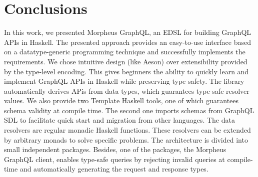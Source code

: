\chapter{Conclusions}

In this work, we presented Morpheus GraphQL, an EDSL for building GraphQL APIs in Haskell. The presented approach provides an easy-to-use interface based on a datatype-generic programming technique and successfully implements the requirements. We chose intuitive design (like Aeson) over extensibility provided by the type-level encoding. 
This gives beginners the ability to quickly learn and implement GraphQL APIs in Haskell while preserving type safety.
The library automatically derives APis from data types, which guarantees type-safe resolver values. We also provide two Template Haskell tools, one of which guarantees schema validity at compile time. The second one imports schemas from GraphQL SDL to facilitate quick start and migration from other languages.
The data resolvers are regular monadic Haskell functions. These resolvers can be extended by arbitrary monads to solve specific problems.  The architecture is divided into small independent packages. Besides, one of the packages, the Morpheus GraphQL client, enables type-safe queries by rejecting invalid queries at compile-time and automatically generating the request and response types.

